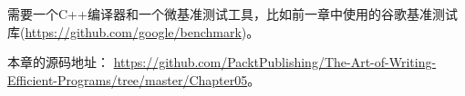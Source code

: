 需要一个C++编译器和一个微基准测试工具，比如前一章中使用的谷歌基准测试库(\url{https://github.com/google/benchmark})。

本章的源码地址： \url{https://github.com/PacktPublishing/The-Art-of-Writing-Efficient-Programs/tree/master/Chapter05}。
